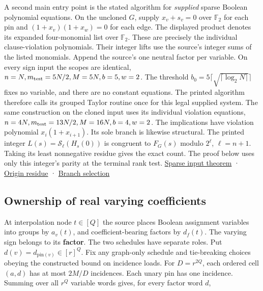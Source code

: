 \documentclass[
  11pt,
]{article}
\begin{document}
A second main entry point is the stated algorithm for \emph{supplied}
sparse Boolean polynomial equations. On the uncloned \(G\), supply
\(x_v+s_v=0\) over \(\mathbb F_2\) for each pin and \((1+x_v)(1+x_w)=0\)
for each edge. The displayed product denotes its expanded four-monomial
list over \(\mathbb F_2\). These are precisely the individual
clause-violation polynomials. Their integer lifts use the source's
integer sums of the listed monomials. Append the source's one neutral
factor per variable. On every sign input the scopes are identical,
\(n=N, m_{\rm test}=5N/2, M=5N, b=5, w=2\). The threshold
\(b_0=5\lceil\sqrt{\lceil\log_2 N\rceil}\rceil\) fixes no variable, and
there are no constant equations. The printed algorithm therefore calls
its grouped Taylor routine once for this legal supplied system. The same
construction on the cloned input uses its individual violation
equations, \(n=4N, m_{\rm test}=13N/2, M=16N, b=4, w=2\). The
implications have violation polynomial \(x_i(1+x_{i+1})\). Its sole
branch is likewise structural. The printed integer
\(L(s)=\mathcal S_\ell(H_s(0))\) is congruent to \(F_G(s)\) modulo
\(2^\ell\), \(\ell=n+1\). Taking its least nonnegative residue gives the
exact count. The proof below uses only this integer's parity at the
terminal rank test.
\href{https://github.com/openai/math/blob/main/preprints/The-Exponential-Time-Hypothesis-is-False-October-25-2026/build/main_full_version.tex\#L1640-L1649}{Sparse
input theorem} ·
\href{https://github.com/openai/math/blob/main/preprints/The-Exponential-Time-Hypothesis-is-False-October-25-2026/build/main_full_version.tex\#L3014-L3041}{Origin
residue} ·
\href{https://github.com/openai/math/blob/main/preprints/The-Exponential-Time-Hypothesis-is-False-October-25-2026/build/main_full_version.tex\#L3096-L3168}{Branch
selection}

\subsection{Ownership of real varying
coefficients}\label{ownership-of-real-varying-coefficients}

At interpolation node \(t\in[Q]\) the source places Boolean assignment
variables into groups by \(a_v(t)\), and coefficient-bearing factors by
\(d_f(t)\). The varying sign belongs to its \textbf{factor}. The two
schedules have separate roles. Put \(d(v)=d_{\mathrm{pin}(v)}\in[r]^Q\).
Fix any graph-only schedule and tie-breaking choices obeying the
constructed bound on incidence loads. For \(D=r^{2Q}\), each ordered
cell \((a,d)\) has at most \(2M/D\) incidences. Each unary pin has one
incidence. Summing over all \(r^Q\) variable words gives, for every
factor word \(d\),
\end{document}
